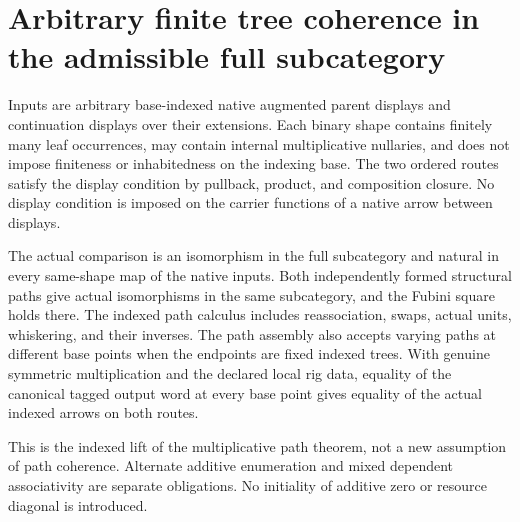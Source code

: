 \documentclass{article}
\begin{document}
\section*{Arbitrary finite tree coherence in the admissible full subcategory}
Inputs are arbitrary base-indexed native augmented parent displays
and continuation displays over their extensions. Each binary shape
contains finitely many leaf occurrences, may contain internal
multiplicative nullaries, and does not impose finiteness or
inhabitedness on the indexing base. The two ordered routes satisfy
the display condition by pullback, product, and composition
closure. No display condition is imposed on the carrier functions
of a native arrow between displays.

The actual comparison is an isomorphism in the full subcategory
and natural in every same-shape map of the native inputs. Both
independently formed structural paths give actual isomorphisms in
the same subcategory, and the Fubini square holds there. The
indexed path calculus includes reassociation, swaps, actual units,
whiskering, and their inverses. The path assembly also accepts
varying paths at different base points when the endpoints are
fixed indexed trees. With genuine symmetric multiplication and
the declared local rig data, equality of the canonical tagged
output word at every base point gives equality of the actual
indexed arrows on both routes.

This is the indexed lift of the multiplicative path theorem, not
a new assumption of path coherence. Alternate additive
enumeration and mixed dependent associativity are separate
obligations. No initiality of additive zero or resource diagonal
is introduced.
\end{document}
